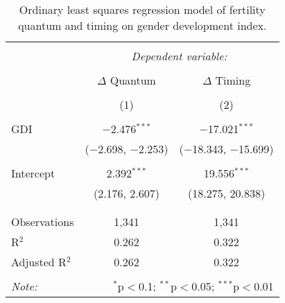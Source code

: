 
\begin{table}[!htbp] \centering 
  \caption{Ordinary least squares regression model of fertility quantum and timing on gender development index.} 
  \label{mod: gdi} 
\begin{tabular}{@{\extracolsep{5pt}}lcc} 
\\[-1.8ex]\hline 
\hline \\[-1.8ex] 
 & \multicolumn{2}{c}{\textit{Dependent variable:}} \\ 
\cline{2-3} 
\\[-1.8ex] & $\Delta$ Quantum & $\Delta$ Timing \\ 
\\[-1.8ex] & (1) & (2)\\ 
\hline \\[-1.8ex] 
 GDI & $-$2.476$^{***}$ & $-$17.021$^{***}$ \\ 
  & ($-$2.698, $-$2.253) & ($-$18.343, $-$15.699) \\ 
  & & \\ 
 Intercept & 2.392$^{***}$ & 19.556$^{***}$ \\ 
  & (2.176, 2.607) & (18.275, 20.838) \\ 
  & & \\ 
\hline \\[-1.8ex] 
Observations & 1,341 & 1,341 \\ 
R$^{2}$ & 0.262 & 0.322 \\ 
Adjusted R$^{2}$ & 0.262 & 0.322 \\ 
\hline 
\hline \\[-1.8ex] 
\textit{Note:}  & \multicolumn{2}{r}{$^{*}$p$<$0.1; $^{**}$p$<$0.05; $^{***}$p$<$0.01} \\ 
\end{tabular} 
\end{table} 
